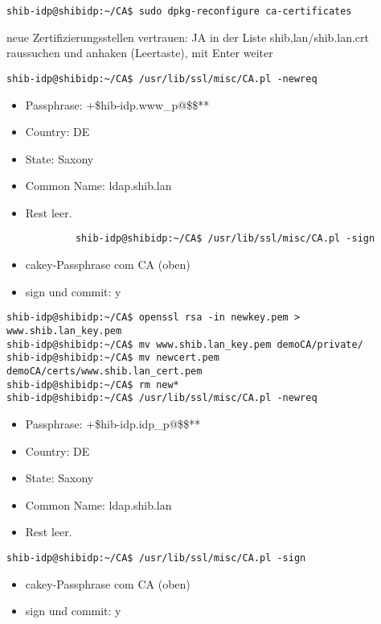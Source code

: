 \begin{lstlisting}
shib-idp@shibidp:~/CA$ sudo dpkg-reconfigure ca-certificates
\end{lstlisting}
neue Zertifizierungsstellen vertrauen: JA \newline
in der Liste shib,lan/shib.lan.crt raussuchen und anhaken (Leertaste), mit Enter weiter

\begin{lstlisting}
shib-idp@shibidp:~/CA$ /usr/lib/ssl/misc/CA.pl -newreq
\end{lstlisting}
\begin{itemize}
\item Passphrase: +\$hib-idp.www\_p@\$\$**
\item Country: DE
\item State: Saxony
\item Common Name: ldap.shib.lan
\item Rest leer.
\end{itemize}
\begin{lstlisting}
			shib-idp@shibidp:~/CA$ /usr/lib/ssl/misc/CA.pl -sign
\end{lstlisting}
\begin{itemize}
  \item cakey-Passphrase com CA (oben)
  \item sign und commit: y
\end{itemize}
\begin{lstlisting}
shib-idp@shibidp:~/CA$ openssl rsa -in newkey.pem > www.shib.lan_key.pem
shib-idp@shibidp:~/CA$ mv www.shib.lan_key.pem demoCA/private/
shib-idp@shibidp:~/CA$ mv newcert.pem demoCA/certs/www.shib.lan_cert.pem
shib-idp@shibidp:~/CA$ rm new*
shib-idp@shibidp:~/CA$ /usr/lib/ssl/misc/CA.pl -newreq
\end{lstlisting}
\begin{itemize}
\item Passphrase: +\$hib-idp.idp\_p@\$\$**
\item Country: DE
\item State: Saxony
\item Common Name: ldap.shib.lan
\item Rest leer.
\end{itemize}
\begin{lstlisting}
shib-idp@shibidp:~/CA$ /usr/lib/ssl/misc/CA.pl -sign
\end{lstlisting}
\begin{itemize}
\item cakey-Passphrase com CA (oben)
\item sign und commit: y
\end{itemize}
